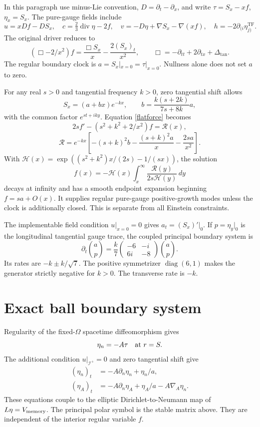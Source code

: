\documentclass[11pt]{article}
\newcommand{\TF}{\mathrm{TF}}
\newcommand{\scri}{\mathscr I^+}
\begin{document}
In this paragraph use minus-Lie convention, $D=\partial_t-\partial_x$, and write $\tau=S_x-xf$, $\eta_x=S_x$. The pure-gauge fields include
\[
 u=xDf-DS_x,\quad c=\tfrac23\operatorname{div}\eta-2f,\quad
 v=-D\eta+\nabla S_x-\nabla(xf),\quad h=-2\partial_{(i}\eta_{j)}^{\TF}.
\]
The original driver reduces to
\begin{equation}
 \left(\Box-2/x^2\right)f=\frac{\Box S_x}{x}-\frac{2(S_x)_t}{x^2},
 \qquad \Box=-\partial_{tt}+2\partial_{tx}+\Delta_{\tan}.\label{flatforce}
\end{equation}
The regular boundary clock is $a=S_x|_{x=0}=\tau|_{x=0}$. Nullness alone does not set $a$ to zero.

For any real $s>0$ and tangential frequency $k>0$, zero tangential shift allows
\[
 S_x=(a+bx)e^{-kx},\qquad b=\frac{k(s+2k)}{7s+8k}a,
\]
with the common factor $e^{st+iky}$. Equation \eqref{flatforce} becomes
\[
 2s f'-(s^2+k^2+2/x^2)f=\mathcal R(x),
\]
\[
 \mathcal R=e^{-kx}\left[-(s+k)^2b-\frac{(s+k)^2a}{x}-\frac{2sa}{x^2}\right].
\]
With $\mathcal H(x)=\exp((s^2+k^2)x/(2s)-1/(sx))$, the solution
\[
 f(x)=-\mathcal H(x)\int_x^\infty\frac{\mathcal R(y)}{2s\mathcal H(y)}\,dy
\]
decays at infinity and has a smooth endpoint expansion beginning $f=sa+O(x)$. It supplies regular pure-gauge positive-growth modes unless the clock is additionally closed. This is separate from all Einstein constraints.

The implementable field condition $u|_{x=0}=0$ gives $a_t=(S_x)'|_{0}$. If $p=\eta_y|_0$ is the longitudinal tangential gauge trace, the coupled principal boundary system is
\[
 \partial_t\binom ap=\frac{k}{7}
 \begin{pmatrix}-6&-i\\6i&-8\end{pmatrix}\binom ap.
\]
Its rates are $-k\pm k/\sqrt7$. The positive symmetrizer $\operatorname{diag}(6,1)$ makes the generator strictly negative for $k>0$. The transverse rate is $-k$.

\section{Exact ball boundary system}
Regularity of the fixed-$\Omega$ spacetime diffeomorphism gives
\[
 \eta_n=-A\tau\quad\hbox{at }r=S.
\]
The additional condition $u|_{\scri}=0$ and zero tangential shift give
\begin{align}
 (\eta_n)_t&=-A\partial_n\eta_n+\eta_n/a,\\
 (\eta_A)_t&=-A\partial_n\eta_A+\eta_A/a-A\nabla_A\eta_n.
\end{align}
These equations couple to the elliptic Dirichlet-to-Neumann map of $L\eta=V_{\rm memory}$. The principal polar symbol is the stable matrix above. They are independent of the interior regular variable $f$.
\end{document}
